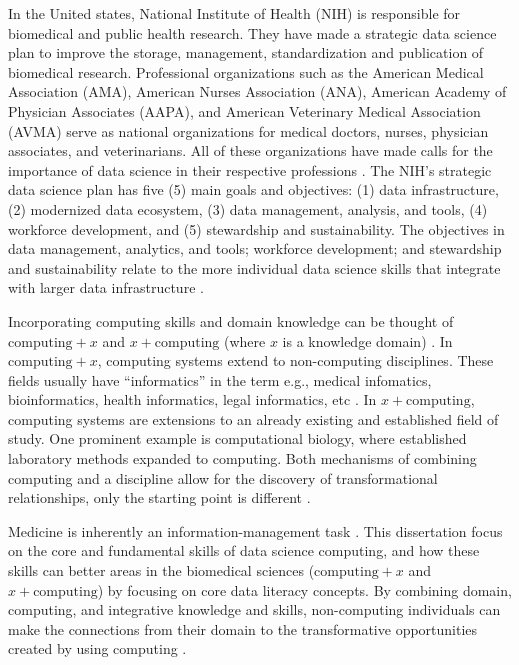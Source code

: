 \documentclass[010-intro.tex]{subfiles}
\begin{document}
In the United states,
National Institute of Health (NIH) is responsible for biomedical and public health research.
They have made a strategic data science plan to improve the
storage, management, standardization and publication of biomedical research.
Professional organizations such as the
American Medical Association (AMA),
American Nurses Association (ANA),
American Academy of Physician Associates (AAPA), and
American Veterinary Medical Association (AVMA)
serve as national organizations for medical doctors, nurses, physician associates, and veterinarians.
All of these organizations have made calls for the importance of data science in their respective professions
\cite{payneBiomedicalInformaticsMeets2018, americanmedicalassociationAcceleratingChangeMedical2021, americannursesassociationANAEnterpriseAmerican, owenEthicalIntersectionHealthcare2017, nolenArtificialIntelligenceVeterinary2020, nationalinstitutesofhealthNIHStrategicPlan2020}.
The NIH's strategic data science plan has five (5) main goals and objectives:
(1) data infrastructure,
(2) modernized data ecosystem,
(3) data management, analysis, and tools,
(4) workforce development, and
(5) stewardship and sustainability. %
The objectives in
data management, analytics, and tools;
workforce development;
and stewardship and sustainability
relate to the more individual data science skills that integrate with larger data infrastructure
\cite{nationalinstitutesofhealthNIHStrategicPlan2020}.

Incorporating computing skills and domain knowledge can be thought of
$\text{computing} + x$ and $x + \text{computing}$ (where $x$ is a knowledge domain)
\cite{cc2020}.
In $\text{computing} + x$, computing systems extend to non-computing disciplines.
These fields usually have ``informatics'' in the term
e.g., medical infomatics, bioinformatics, health informatics, legal informatics, etc \cite{cc2020}.
In $x + \text{computing}$,
computing systems are extensions to an already existing and established field of study.
One prominent example is computational biology,
where established laboratory methods expanded to computing.
Both mechanisms of combining computing and a discipline allow for the discovery of transformational relationships,
only the starting point is different \cite{cc2020}.

Medicine is inherently an information-management task
\cite{shortliffe1993adolescence}.
This dissertation focus on the core and fundamental skills
of data science computing, and how these skills can better areas in the biomedical sciences
($\text{computing} + x$ and $x + \text{computing}$)
by focusing on core data literacy concepts.
By combining domain, computing, and integrative knowledge and skills,
non-computing individuals can make the connections from their domain to the transformative opportunities
created by using computing \cite{cc2020}.
\end{document}
